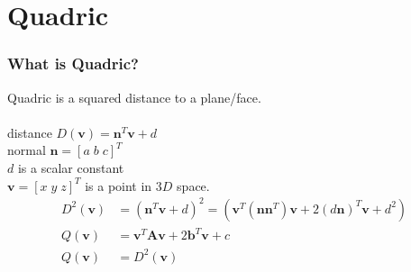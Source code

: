 \documentclass[
	10pt,
	t		%
]{beamer}
\begin{document}
\section{Quadric}
\begin{frame}
\frametitle{What is Quadric?}
Quadric is a squared distance to a plane/face.\\~\\
\centering
distance $D(\mathbf{v}) = \mathbf{n}^T\mathbf{v}+d$\\ normal $\mathbf{n} = [a\;b\;c]^T$\\ $d$ is a scalar constant\\ $\mathbf{v} = [x\;y\;z]^T$ is a point in $3D$ space.
\\
\begin{align}
D^2(\mathbf{v}) &= (\mathbf{n}^T\mathbf{v}+d)^2 = (\mathbf{v}^T(\mathbf{n}\mathbf{n}^T)\mathbf{v}+2(d\mathbf{n})^T\mathbf{v}+d^2)\\
Q(\mathbf{v}) &= \mathbf{v}^T\mathbf{A}\mathbf{v} + 2\mathbf{b}^T\mathbf{v} + c\\
Q(\mathbf{v}) &= D^2(\mathbf{v})
\end{align}
\end{frame}
\end{document}
